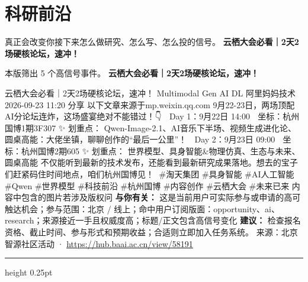 \documentclass[10.5pt]{ctexart}
\begin{document}
\section*{科研前沿}
{\color{ormuted} 真正会改变你接下来怎么做研究、怎么写、怎么投的信号。}
\vspace{2mm}
{\LARGE\bfseries 云栖大会必看｜2天2场硬核论坛，速冲！}\par
\vspace{1mm}
{\color{ormuted} 本版筛出 5 个高信号事件。}
\vspace{3mm}
{\Large\bfseries 云栖大会必看｜2天2场硬核论坛，速冲！}\par
云栖大会必看｜2天2场硬核论坛，速冲！ Multimodal Gen AI DL 阿里妈妈技术 2026-09-23 11:20 分享 以下文章来源于mp.weixin.qq.com 9月22-23日，两场顶配AI分论坛连炸，这场盛宴绝对不能错过！👇 🎨 Day 1：9月22日 14:00 📍 坐标：杭州国博1期3F307 ✨ 划重点： Qwen-Image-2.1、AI音乐下半场、视频生成进化论、圆桌高能：大佬坐镇，聊聊创作的“最后一公里”！ 🎨 Day 2：9月23日 09:00 📍 坐标：杭州国博2期605 ✨ 划重点： 世界模型、具身智能\&物理仿真、生态与未来、圆桌高能 不仅能听到最新的技术发布，还能看到最新研究成果落地。想去的宝子们赶紧码住时间地点，咱们杭州国博见！👋 \#淘天集团 \#具身智能 \#AI人工智能 \#Qwen \#世界模型 \#科技前沿 \#杭州国博 \#内容创作 \#云栖大会 \#未来已来 内容中包含的图片若涉及版权问
\textbf{与你有关：} 这是当前用户可实际参与或申请的高可触达机会；参与范围：北京 / 线上；命中用户订阅版面：opportunity、ai、research；来源接近一手且权威度高；标题/正文包含高信号变化
\textbf{建议：} 检查报名资格、截止时间、参与形式和预期收益；合适则立即加入任务系统。
{\footnotesize\color{ormuted} 来源：北京智源社区活动 · \url{https://hub.baai.ac.cn/view/58191}}
\vspace{4mm}
\hrule height 0.25pt
\vspace{3mm}
\end{document}
